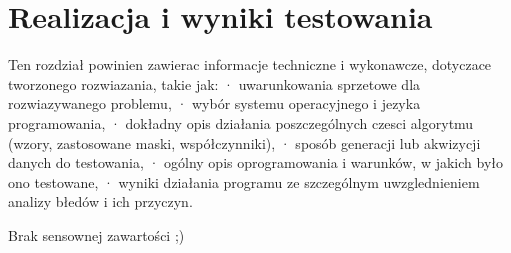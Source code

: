\chapter{Realizacja i wyniki testowania}

Ten rozdział powinien zawierac informacje techniczne i wykonawcze, dotyczace tworzonego
rozwiazania, takie jak:
·  uwarunkowania sprzetowe dla rozwiazywanego problemu,
·  wybór systemu operacyjnego i jezyka programowania,
·  dokładny opis działania poszczególnych czesci algorytmu (wzory, zastosowane maski,
współczynniki),
·  sposób generacji lub akwizycji danych do testowania,
·  ogólny opis oprogramowania i warunków, w jakich było ono testowane,
·  wyniki działania programu ze szczególnym uwzglednieniem analizy błedów i ich przyczyn.


Brak sensownej zawartości ;)


